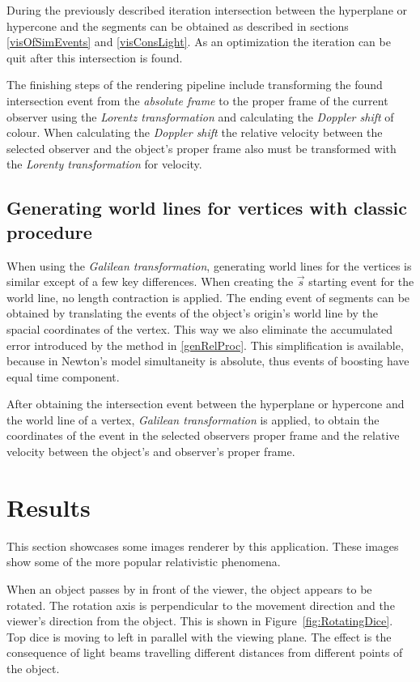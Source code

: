 \documentclass{egpubl}
\begin{document}
During the previously described iteration intersection between the hyperplane or hypercone and the segments can be obtained as described in sections \ref{visOfSimEvents} and \ref{visConsLight}. As an optimization the iteration can be quit after this intersection is found.

The finishing steps of the rendering pipeline include transforming the found intersection event from the \emph{absolute frame} to the proper frame of the current observer using the \emph{Lorentz transformation} and calculating the \emph{Doppler shift} of colour. When calculating the \emph{Doppler shift} the relative velocity between the selected observer and the object's proper frame also must be transformed with the \emph{Lorenty transformation} for velocity.

\subsection{Generating world lines for vertices with classic procedure}
When using the \emph{Galilean transformation}, generating world lines for the vertices is similar except of a few key differences. When creating the $\vec{s}$ starting event for the world line, no length contraction is applied. The ending event of segments can be obtained by translating the events of the object's origin's world line by the spacial coordinates of the vertex. This way we also eliminate the accumulated error introduced by the method in \ref{genRelProc}. This simplification is available, because in Newton's model simultaneity is absolute, thus events of boosting have equal time component.

After obtaining the intersection event between the hyperplane or hypercone and the world line of a vertex, \emph{Galilean transformation} is applied, to obtain the coordinates of the event in the selected observers proper frame and the relative velocity between the object's and observer's proper frame.

\section{Results}
\label{sec:results}
This section showcases some images renderer by this application. These images show some of the more popular relativistic phenomena.

When an object passes by in front of the viewer, the object appears to be rotated. The rotation axis is perpendicular to the movement direction and the viewer's direction from the object. This is shown in Figure~\ref{fig:RotatingDice}. Top dice is moving to left in parallel with the viewing plane. The effect is the consequence of light beams travelling different distances from different points of the object.
\end{document}
